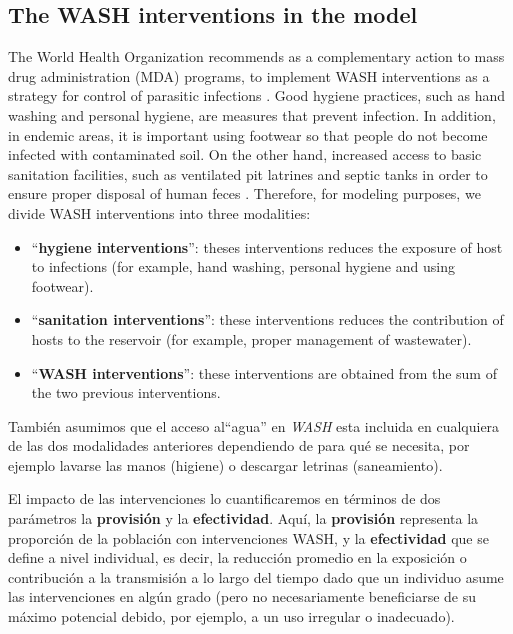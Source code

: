 \documentclass[12pt,a4paper]{article}
\theoremstyle{plain}%
\theoremstyle{definition}
\theoremstyle{remark}
\begin{document}
	\subsection{The WASH interventions in the model}
	The World Health Organization recommends as a complementary action to mass drug administration (MDA) programs, to implement WASH interventions as a strategy for control of parasitic infections \cite{who2012soil}.
	Good hygiene practices, such as hand washing and personal hygiene, are measures that prevent infection. In addition, in endemic areas, it is important using footwear so that people do not become infected with contaminated soil. 
	On the other hand, increased access to basic sanitation facilities, such as ventilated pit latrines and septic tanks in order to ensure proper disposal of human feces \cite{paho2003,who2012soil}.
	Therefore, for modeling purposes, we divide WASH interventions into three modalities:
	\begin{itemize}
		\item ``\textbf{hygiene interventions}'': theses interventions reduces the exposure of host to infections (for example, hand washing, personal hygiene and using footwear).
		\item  ``\textbf{sanitation interventions}'': these interventions reduces the contribution of hosts to the reservoir (for example, proper management of wastewater).
		\item ``\textbf{WASH interventions}'': these interventions are obtained from the sum of the two previous interventions.
	\end{itemize}
	{\color{red}
	También
	asumimos que el acceso al``agua'' en \textit{WASH} esta incluida en cualquiera de las dos modalidades anteriores  dependiendo de para qué se necesita, por ejemplo  lavarse las manos (higiene) o descargar letrinas (saneamiento)\cite{coffeng2018predicted}.
	
	El impacto de las intervenciones lo cuantificaremos en términos
	de dos parámetros la \textbf{provisión} y la \textbf{efectividad}. 	
	 Aquí, la \textbf{provisión}  representa la proporción de la población con intervenciones WASH, y la \textbf{efectividad} que se define a nivel individual, es decir, la reducción promedio en la exposición o contribución a la transmisión a lo largo del tiempo dado que un individuo asume las intervenciones en algún grado (pero no necesariamente beneficiarse de su máximo potencial debido, por ejemplo, a un uso irregular o inadecuado).
	}
	 
\end{document}
